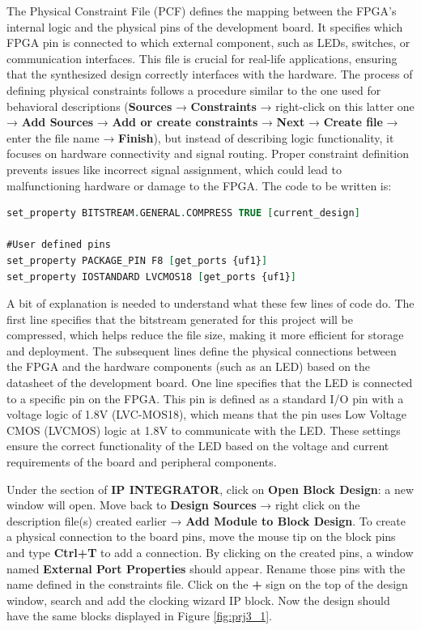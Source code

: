 The Physical Constraint File (PCF) defines the mapping between the FPGA's internal logic and the physical pins of the development board. It specifies which FPGA pin is connected to which external component, such as LEDs, switches, or communication interfaces. This file is crucial for real-life applications, ensuring that the synthesized design correctly interfaces with the hardware. The process of defining physical constraints follows a procedure similar to the one used for behavioral descriptions (\textbf{Sources} → \textbf{Constraints} → right-click on this latter one → \textbf{Add Sources} → \textbf{Add or create constraints} → \textbf{Next} → \textbf{Create file} → enter the file name → \textbf{Finish}), but instead of describing logic functionality, it focuses on hardware connectivity and signal routing. Proper constraint definition prevents issues like incorrect signal assignment, which could lead to malfunctioning hardware or damage to the FPGA. The code to be written is:
\vspace{0.1cm}
\begin{lstlisting}[language=VHDL]
set_property BITSTREAM.GENERAL.COMPRESS TRUE [current_design]

#User defined pins
set_property PACKAGE_PIN F8 [get_ports {uf1}]
set_property IOSTANDARD LVCMOS18 [get_ports {uf1}]
\end{lstlisting}
\vspace{0.1cm}
A bit of explanation is needed to understand what these few lines of code do. The first line specifies that the bitstream generated for this project will be compressed, which helps reduce the file size, making it more efficient for storage and deployment. The subsequent lines define the physical connections between the FPGA and the hardware components (such as an LED) based on the datasheet of the development board. One line specifies that the LED is connected to a specific pin on the FPGA. This pin is defined as a standard I/O pin with a voltage logic of 1.8V (LVC-MOS18), which means that the pin uses Low Voltage CMOS (LVCMOS) logic at 1.8V to communicate with the LED. These settings ensure the correct functionality of the LED based on the voltage and current requirements of the board and peripheral components.


Under the section of \textbf{IP INTEGRATOR}, click on \textbf{Open Block Design}: a new window will open. Move back to \textbf{Design Sources} → right click on the description file(s) created earlier → \textbf{Add Module to Block Design}. To create a physical connection to the board pins, move the mouse tip on the block pins and type \textbf{Ctrl+T} to add a connection. By clicking on the created pins, a window named \textbf{External Port Properties} should appear. Rename those pins with the name defined in the constraints file. Click on the \textbf{+} sign on the top of the design window, search and add the clocking wizard IP block. Now the design should have the same blocks displayed in Figure \ref{fig:prj3_1}.

